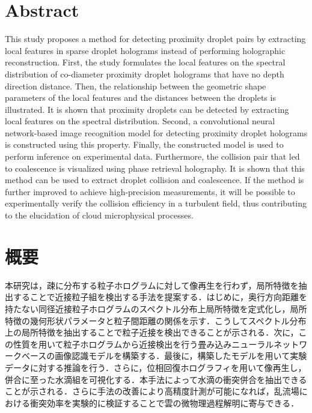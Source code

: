 \section*{Abstract}
This study proposes a method for detecting proximity droplet pairs by extracting local features in sparse droplet holograms instead of performing holographic reconstruction. First, the study formulates the local features on the spectral distribution of co-diameter proximity droplet holograms that have no depth direction distance. Then, the relationship between the geometric shape parameters of the local features and the distances between the droplets is illustrated. It is shown that proximity droplets can be detected by extracting local features on the spectral distribution. Second, a convolutional neural network-based image recognition model for detecting proximity droplet holograms is constructed using this property. Finally, the constructed model is used to perform inference on experimental data. Furthermore, the collision pair that led to coalescence is visualized using phase retrieval holography. It is shown that this method can be used to extract droplet collision and coalescence. If the method is further improved to achieve high-precision measurements, it will be possible to experimentally verify the collision efficiency in a turbulent field, thus contributing to the elucidation of cloud microphysical processes.
\newpage
\section*{概要}
本研究は，疎に分布する粒子ホログラムに対して像再生を行わず，局所特徴を抽出することで近接粒子組を検出する手法を提案する．はじめに，奥行方向距離を持たない同径近接粒子ホログラムのスペクトル分布上局所特徴を定式化し，局所特徴の幾何形状パラメータと粒子間距離の関係を示す．こうしてスペクトル分布上の局所特徴を抽出することで粒子近接を検出できることが示される．次に，この性質を用いて粒子ホログラムから近接検出を行う畳み込みニューラルネットワークベースの画像認識モデルを構築する．最後に，構築したモデルを用いて実験データに対する推論を行う．さらに，位相回復ホログラフィを用いて像再生し，併合に至った水滴組を可視化する．本手法によって水滴の衝突併合を抽出できることが示される．さらに手法の改善により高精度計測が可能になれば，乱流場における衝突効率を実験的に検証することで雲の微物理過程解明に寄与できる．

\newpage
\tableofcontents
\newpage
{} 
